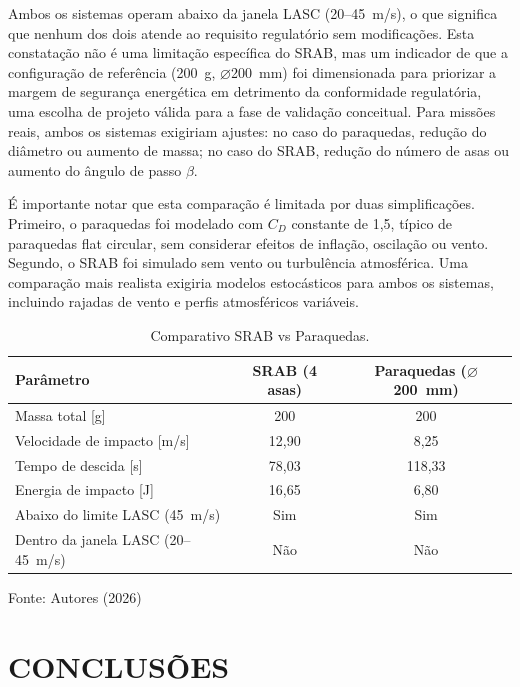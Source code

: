 \documentclass[12pt,fleqn]{article}
\begin{document}
Ambos os sistemas operam abaixo da janela LASC (20--45~m/s), o que significa que nenhum dos dois atende ao requisito regulatório sem modificações. Esta constatação não é uma limitação específica do SRAB, mas um indicador de que a configuração de referência (200~g, $\varnothing$200~mm) foi dimensionada para priorizar a margem de segurança energética em detrimento da conformidade regulatória, uma escolha de projeto válida para a fase de validação conceitual. Para missões reais, ambos os sistemas exigiriam ajustes: no caso do paraquedas, redução do diâmetro ou aumento de massa; no caso do SRAB, redução do número de asas ou aumento do ângulo de passo $\beta$.

É importante notar que esta comparação é limitada por duas simplificações. Primeiro, o paraquedas foi modelado com $C_D$ constante de 1,5, típico de paraquedas flat circular, sem considerar efeitos de inflação, oscilação ou vento. Segundo, o SRAB foi simulado sem vento ou turbulência atmosférica. Uma comparação mais realista exigiria modelos estocásticos para ambos os sistemas, incluindo rajadas de vento e perfis atmosféricos variáveis.

\begin{table}[htbp]
\caption{Comparativo SRAB vs Paraquedas.}
\centering
\begin{tabular*}{\textwidth}{@{\extracolsep{\fill}}lcc}
\hline
Parâmetro & SRAB (4 asas) & Paraquedas ($\varnothing$200~mm) \\
\hline
Massa total [g] & 200 & 200 \\
Velocidade de impacto [m/s] & 12,90 & 8,25 \\
Tempo de descida [s] & 78,03 & 118,33 \\
Energia de impacto [J] & 16,65 & 6,80 \\
Abaixo do limite LASC (45~m/s) & Sim & Sim \\
Dentro da janela LASC (20--45~m/s) & Não & Não \\
\hline
\end{tabular*}
{\footnotesize\centering Fonte: Autores (2026)\par}
\label{tab:benchmark}
\end{table}


\section{CONCLUSÕES}
\end{document}
